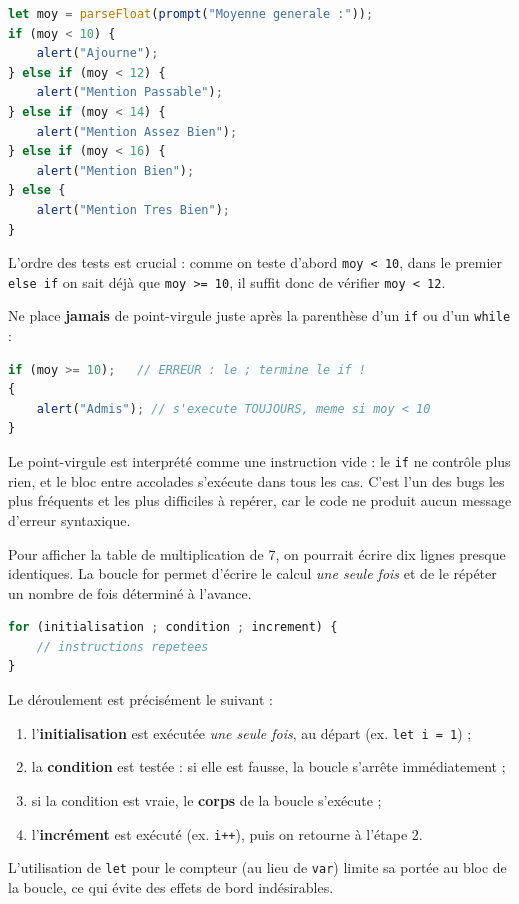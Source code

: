 \documentclass[11pt]{article}
\newcommand{\cle}[1]{{\popxbold\color{popdark}#1}}
\newcounter{popsec}
\newcounter{popsub}
\newcommand{\courssub}[1]{%
  \stepcounter{popsub}%
  \par\vspace{9pt}\noindent{\popxbold\fontsize{11.5}{13}\selectfont\color{popink}{\color{poporange}\thepopsec.\thepopsub}\hspace{6pt}#1}\par\nopagebreak\vspace{4pt}
}
\begin{document}
\begin{exemplebox}
\begin{lstlisting}[language=JavaScript]
let moy = parseFloat(prompt("Moyenne generale :"));
if (moy < 10) {
    alert("Ajourne");
} else if (moy < 12) {
    alert("Mention Passable");
} else if (moy < 14) {
    alert("Mention Assez Bien");
} else if (moy < 16) {
    alert("Mention Bien");
} else {
    alert("Mention Tres Bien");
}
\end{lstlisting}
L'ordre des tests est crucial : comme on teste d'abord \texttt{moy < 10}, dans le premier \texttt{else if} on sait déjà que \texttt{moy >= 10}, il suffit donc de vérifier \texttt{moy < 12}.
\end{exemplebox}

\begin{attention}
Ne place \textbf{jamais} de point-virgule juste après la parenthèse d'un \texttt{if} ou d'un \texttt{while} :
\begin{lstlisting}[language=JavaScript]
if (moy >= 10);   // ERREUR : le ; termine le if !
{
    alert("Admis"); // s'execute TOUJOURS, meme si moy < 10
}
\end{lstlisting}
Le point-virgule est interprété comme une instruction vide : le \texttt{if} ne contrôle plus rien, et le bloc entre accolades s'exécute dans tous les cas. C'est l'un des bugs les plus fréquents et les plus difficiles à repérer, car le code ne produit aucun message d'erreur syntaxique.
\end{attention}

\courssub{La boucle \texttt{for} : un nombre de tours connu}

Pour afficher la table de multiplication de 7, on pourrait écrire dix lignes presque identiques. La boucle \cle{for} permet d'écrire le calcul \emph{une seule fois} et de le répéter un nombre de fois déterminé à l'avance.

\begin{propriete}
\begin{lstlisting}[language=JavaScript]
for (initialisation ; condition ; increment) {
    // instructions repetees
}
\end{lstlisting}
Le déroulement est précisément le suivant :
\begin{enumerate}
\item l'\textbf{initialisation} est exécutée \emph{une seule fois}, au départ (ex. \texttt{let i = 1}) ;
\item la \textbf{condition} est testée : si elle est fausse, la boucle s'arrête immédiatement ;
\item si la condition est vraie, le \textbf{corps} de la boucle s'exécute ;
\item l'\textbf{incrément} est exécuté (ex. \texttt{i++}), puis on retourne à l'étape 2.
\end{enumerate}
L'utilisation de \texttt{let} pour le compteur (au lieu de \texttt{var}) limite sa portée au bloc de la boucle, ce qui évite des effets de bord indésirables.
\end{propriete}
\end{document}
